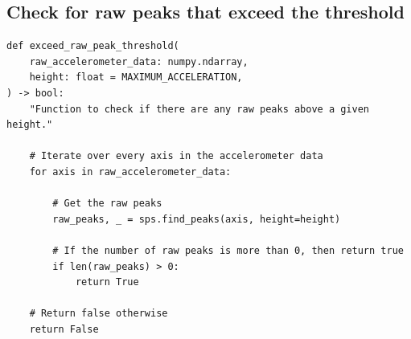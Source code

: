 \documentclass[12pt]{report}
\begin{document}
\subsection{Check for raw peaks that exceed the threshold}
\label{sec:orgf6f2794}
\begin{verbatim}
def exceed_raw_peak_threshold(
    raw_accelerometer_data: numpy.ndarray,
    height: float = MAXIMUM_ACCELERATION,
) -> bool:
    "Function to check if there are any raw peaks above a given height."

    # Iterate over every axis in the accelerometer data
    for axis in raw_accelerometer_data:

        # Get the raw peaks
        raw_peaks, _ = sps.find_peaks(axis, height=height)

        # If the number of raw peaks is more than 0, then return true
        if len(raw_peaks) > 0:
            return True

    # Return false otherwise
    return False
\end{verbatim}
\end{document}
